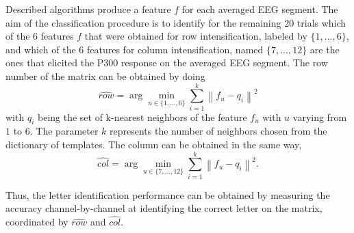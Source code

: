 \documentclass[brainsci,article,accept,moreauthors,pdftex,10pt,a4paper]{mdpi}
\begin{document}
Described algorithms produce a feature $f$ for each averaged EEG segment.  The aim of the classification procedure is to identify for the remaining $20$ trials which of the 6 features $f$ that were obtained for row intensification, labeled by $\{ 1,...,6 \}$, and which of the 6 features for column intensification, named $\{ 7,...,12 \}$ are the ones that elicited the P300 response on the averaged EEG segment. The row number of the matrix can be obtained by doing
\begin{equation}
\hat{row} = \arg \min_{u \in \{1,\dots,6\}} \sum_{i=1}^{k} \left\lVert f_u - q_i \right\rVert ^2
\label{eq:multiclassificationrow}
\end{equation}
with $q_i$ being the set of k-nearest neighbors of the feature $f_u$ with $u$ varying from $1$ to $6$.  The parameter $k$ represents the number of neighbors chosen from the dictionary of templates.  The column can be obtained in the same way,
\begin{equation}
\hat{col} = \arg \min_{u \in \{7,\dots,12\}} \sum_{i=1}^{k} \left\lVert f_u - q_i \right\rVert ^2.
\label{eq:multiclassificationcol}
\end{equation}

Thus, the letter identification performance can be obtained by measuring the accuracy channel-by-channel at identifying the correct letter on the matrix, coordinated by $ \hat{row} $ and $ \hat{col} $.




\end{document}
